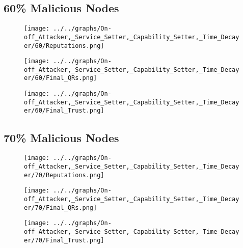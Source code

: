 \begin{minipage}[t]{0.49\columnwidth}
\subsection*{60\% Malicious Nodes}
    \begin{figure}[H]
        \centering
        \texttt{[image: ../../graphs/On-off\_Attacker,\_Service\_Setter,\_Capability\_Setter,\_Time\_Decayer/60/Reputations.png]}
    \end{figure}
    \begin{figure}[H]
        \centering
        \texttt{[image: ../../graphs/On-off\_Attacker,\_Service\_Setter,\_Capability\_Setter,\_Time\_Decayer/60/Final\_QRs.png]}
    \end{figure}
\end{minipage}
\begin{minipage}[t]{0.49\columnwidth}
    \begin{figure}[H]
        \centering
        \texttt{[image: ../../graphs/On-off\_Attacker,\_Service\_Setter,\_Capability\_Setter,\_Time\_Decayer/60/Final\_Trust.png]}
    \end{figure}
\end{minipage}

\begin{minipage}[t]{0.49\columnwidth}
\subsection*{70\% Malicious Nodes}
    \begin{figure}[H]
        \centering
        \texttt{[image: ../../graphs/On-off\_Attacker,\_Service\_Setter,\_Capability\_Setter,\_Time\_Decayer/70/Reputations.png]}
    \end{figure}
    \begin{figure}[H]
        \centering
        \texttt{[image: ../../graphs/On-off\_Attacker,\_Service\_Setter,\_Capability\_Setter,\_Time\_Decayer/70/Final\_QRs.png]}
    \end{figure}
\end{minipage}
\begin{minipage}[t]{0.49\columnwidth}
    \begin{figure}[H]
        \centering
        \texttt{[image: ../../graphs/On-off\_Attacker,\_Service\_Setter,\_Capability\_Setter,\_Time\_Decayer/70/Final\_Trust.png]}
    \end{figure}
\end{minipage}

